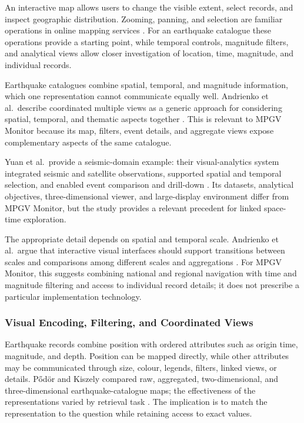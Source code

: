 \documentclass[12pt]{article}
\begin{document}
An interactive map allows users to change the visible extent, select records, and inspect geographic distribution. Zooming, panning, and selection are familiar operations in online mapping services \cite[p.~1596]{Andrienko2010}. For an earthquake catalogue these operations provide a starting point, while temporal controls, magnitude filters, and analytical views allow closer investigation of location, time, magnitude, and individual records.

Earthquake catalogues combine spatial, temporal, and magnitude information, which one representation cannot communicate equally well. Andrienko et al.\ describe coordinated multiple views as a generic approach for considering spatial, temporal, and thematic aspects together \cite[p.~1585]{Andrienko2010}. This is relevant to MPGV Monitor because its map, filters, event details, and aggregate views expose complementary aspects of the same catalogue.

Yuan et al.\ provide a seismic-domain example: their visual-analytics system integrated seismic and satellite observations, supported spatial and temporal selection, and enabled event comparison and drill-down \cite[p.~1413]{Yuan2010}. Its datasets, analytical objectives, three-dimensional viewer, and large-display environment differ from MPGV Monitor, but the study provides a relevant precedent for linked space-time exploration.

The appropriate detail depends on spatial and temporal scale. Andrienko et al.\ argue that interactive visual interfaces should support transitions between scales and comparisons among different scales and aggregations \cite[p.~1595]{Andrienko2010}. For MPGV Monitor, this suggests combining national and regional navigation with time and magnitude filtering and access to individual record details; it does not prescribe a particular implementation technology.

\subsubsection{Visual Encoding, Filtering, and Coordinated Views}

Earthquake records combine position with ordered attributes such as origin time, magnitude, and depth. Position can be mapped directly, while other attributes may be communicated through size, colour, legends, filters, linked views, or details. P{\H{o}}d{\"o}r and Kiszely compared raw, aggregated, two-dimensional, and three-dimensional earthquake-catalogue maps; the effectiveness of the representations varied by retrieval task \cite[pp.~160--161]{PodorKiszely2014}. The implication is to match the representation to the question while retaining access to exact values.
\end{document}
